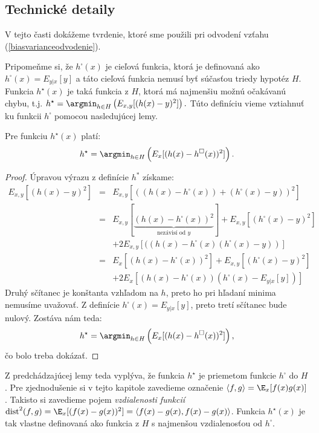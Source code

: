 \subsection{Technické detaily}
\label{tradeoff:tech}

\def\dist{\text{dist}}

V tejto časti dokážeme tvrdenie, ktoré sme použili pri odvodení vzťahu
(\ref{biasvarianceodvodenie}).

Pripomeňme si, že $h^{\square}(x)$ je cieľová funkcia, ktorá je
definovaná ako $h^{\square}(x)=E_{y|x}[y]$ a táto cieľová funkcia
nemusí byť súčasťou triedy hypotéz $H$.
Funkcia $h^\star(x)$ je taká funkcia z $H$, ktorá má najmenšiu možnú
očakávanú chybu, t.j. $h^\star = \argmin_{h\in H} \left(
E_{x,y}[(h(x)-y)^2] \right).$ Túto definíciu vieme vztiahnuť ku funkcii
$h^\square$ pomocou nasledujúcej lemy.

\begin{lemma}
  Pre funkciu $h^\star(x)$ platí:
  $$h^\star=\argmin_{h\in H} \left(E_{x}[(h(x)-h^\square(x))^2] \right).$$
\label{lemaprojekcia}
\end{lemma}

\begin{proof}
Úpravou výrazu z definície $h^*$ získame:
\begin{eqnarray*}
  E_{x,y}[(h(x)-y)^2] & = & E_{x,y}[((h(x)-h^{\square}(x))+(h^{\square}(x)-y))^2]\\
  & = & E_{x,y}[\underbrace{(h(x)-h^{\square}(x))^2}_{\text{nezávisí od $y$}}] + E_{x,y}[(h^{\square}(x)-y)^2]\\ && + 2E_{x,y}[((h(x)-h^{\square}(x)(h^{\square}(x)-y))]\\
    & = & E_x[(h(x)-h^{\square}(x))^2] + E_{x,y}[(h^{\square}(x)-y)^2]\\&&+ 2E_x[(h(x)-h^{\square}(x))(h^{\square}(x)-E_{y|x}[y])]
\end{eqnarray*}
Druhý sčítanec je konštanta vzhľadom na $h$, preto ho pri hľadaní
minima nemusíme uvažovať. Z definície $h^{\square}(x)=E_{y|x}[y]$, preto tretí
sčítanec bude nulový. Zostáva nám teda:
$$h^\star=\argmin_{h\in H} \left(E_{x}[(h(x)-h^\square(x))^2] \right),$$
čo bolo treba dokázať.
\end{proof}

\noindent
Z predchádzajúcej lemy teda vyplýva, že funkcia $h^\star$ je priemetom
funkcie $h^\square$ do $H$.
Pre zjednodušenie si v tejto kapitole
zavedieme označenie $\langle f,g \rangle = \E_x[f(x)g(x)]$.  Takisto
si zavedieme pojem \emph{vzdialenosti funkcií}
$\dist^2(f,g)=\E_x[(f(x)-g(x))^2]=\langle f(x)-g(x),f(x)-g(x)
\rangle$.  Funkcia $h^{\star}(x)$ je tak vlastne definovaná ako
funkcia z $H$ s najmenšou vzdialenosťou od $h^\square$.

